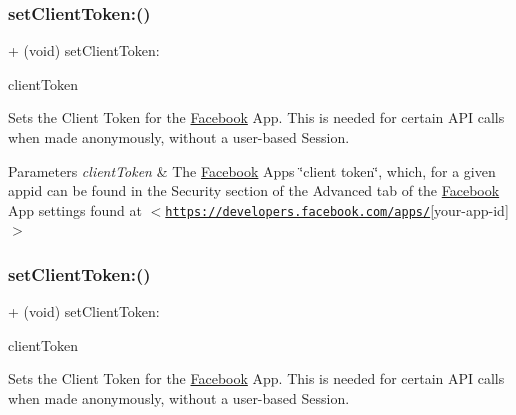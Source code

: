 \subsubsection{\texorpdfstring{set\+Client\+Token\+:()}{setClientToken:()}\hspace{0.1cm}{\footnotesize\ttfamily [4/5]}}
{\footnotesize\ttfamily + (void) set\+Client\+Token\+: \begin{DoxyParamCaption}\item[{(N\+S\+String $\ast$)}]{client\+Token }\end{DoxyParamCaption}}

Sets the Client Token for the \hyperlink{interfaceFacebook}{Facebook} App. This is needed for certain A\+PI calls when made anonymously, without a user-\/based Session.


\begin{DoxyParams}{Parameters}
{\em client\+Token} & The \hyperlink{interfaceFacebook}{Facebook} App\textquotesingle{}s \char`\"{}client token\char`\"{}, which, for a given appid can be found in the Security section of the Advanced tab of the \hyperlink{interfaceFacebook}{Facebook} App settings found at $<$\href{https://developers.facebook.com/apps/}{\tt https\+://developers.\+facebook.\+com/apps/}\mbox{[}your-\/app-\/id\mbox{]}$>$ \\
\hline
\end{DoxyParams}
\mbox{\label{interfaceFBSettings_a07cfc161668c190bf5fd37934821c4de}} 
\subsubsection{\texorpdfstring{set\+Client\+Token\+:()}{setClientToken:()}\hspace{0.1cm}{\footnotesize\ttfamily [5/5]}}
{\footnotesize\ttfamily + (void) set\+Client\+Token\+: \begin{DoxyParamCaption}\item[{(N\+S\+String $\ast$)}]{client\+Token }\end{DoxyParamCaption}}

Sets the Client Token for the \hyperlink{interfaceFacebook}{Facebook} App. This is needed for certain A\+PI calls when made anonymously, without a user-\/based Session.


